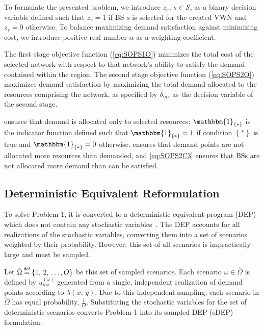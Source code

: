 \documentclass[conference]{IEEEtran}
\newcommand\defeq{\mathrel{\overset{\makebox[0pt]{\mbox{\normalfont\tiny\sffamily def}}}{=}}}
\begin{document}
To formulate the presented problem, we introduce $z_s,\, s \in \mathcal{S}$, as a binary decision variable defined such that $z_s = 1$ if BS $s$ is selected for the created VWN and $z_s = 0$ otherwise.  To balance maximizing demand satisfaction against minimizing cost, we introduce positive real number $\alpha$ as a weighting coefficient.

The first stage objective function (\cref{eq:SOPS1O}) minimizes the total cost of the selected network with respect to that network's ability to satisfy the demand contained within the region.  The second stage objective function (\cref{eq:SOPS2O}) maximizes demand satisfaction by maximizing the total demand allocated to the resources comprising the network, as specified by $\delta_{ms}$ as the decision variable of the second stage.

 ensures that demand is allocated only to selected resources; $\mathbbm{1}_{\left\{ * \right\}}$ is the indicator function defined such that $\mathbbm{1}_{\left\{ * \right\}} = 1$ if condition $\left\{ * \right\}$ is true and $\mathbbm{1}_{\left\{ * \right\}} = 0$ otherwise.   ensures that demand points are not allocated more resources than demanded, and \cref{eq:SOPS2C3} ensures that BSs are not allocated more demand than can be satisfied.

\subsection{Deterministic Equivalent Reformulation} \label{subsec:dep}

To solve Problem 1, it is converted to a deterministic equivalent program (DEP) which does not contain any stochastic variables~\cite{stochprogramming}.  The DEP accounts for all realizations of the stochastic variables, converting them into a set of scenarios weighted by their probability.  However, this set of all scenarios is impractically large and must be sampled.

Let $\hat{\Omega} \defeq \left\{ 1,\, 2,\, \ldots, O \right\}$ be this set of sampled scenarios.  Each scenario $\omega \in \hat{\Omega}$ is defined by $u_{ms}^{\left( \omega \right)}$ generated from a single, independent realization of demand points according to $\lambda\left( x,\, y \right)$.  Due to this independent sampling, each scenario in $\hat{\Omega}$ has equal probability, $\frac{1}{O}$.  Substituting the stochastic variables for the set of deterministic scenarios converts Problem 1 into its sampled DEP (sDEP) formulation.
\end{document}

